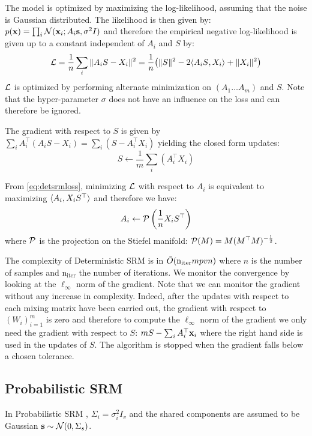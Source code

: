\documentclass{article}
\begin{document}
The model is optimized by maximizing the log-likelihood, assuming that
the noise is Gaussian distributed.
%
The likelihood is then given by: $p(\mathbf{x}) = \prod_i \mathcal{N}(\mathbf{x}_i; A_i \mathbf{s}, \sigma^2 I)$ and
therefore the empirical
%
%
negative log-likelihood is given up to a constant independent of
$A_i$ and $S$ by:
\begin{align}
  \mathcal{L} = \frac1{n} \sum_i \|A_i S - X_i \|^2 = \frac1{n} \big(\| S \|^2 -2 \langle{ A_i S},{ X_i }\rangle + \| X_i \|^2 \big)
  \label{eq:detsrmloss}
\end{align}
$\mathcal{L}$ is optimized by performing alternate minimization on $(A_1 \dots A_m)$
and $S$.
%
Note that the hyper-parameter $\sigma$ does not have an influence on
the loss and can therefore be ignored.



The gradient with respect to $S$ is given by $\sum_i A_i^{\top}(A_i S -
X_i) = \sum_i (S - A_i^{\top} X_i)$
yielding the closed form updates:
\begin{equation}
  S \leftarrow  \frac1m \sum_i (A_i^{\top} X_i)
  \label{eq:srm:supdate}
\end{equation}

From \eqref{eq:detsrmloss}, minimizing $\mathcal{L}$ with respect to $A_i$ is
equivalent to maximizing $\langle{ A_i},{ X_i S^{\top} }\rangle$ and therefore we
have:
\begin{equation}
  A_i \leftarrow  \mathcal{P} \left(\frac1{n}X_i S^{\top} \right)
  \label{eq:detsrm:Aiupdate}
\end{equation}
where $\mathcal{P}$ is the projection on the Stiefel manifold: $\mathcal{P}(M) = M
(M^{\top}M)^{-\frac12}$.
%


The complexity of Deterministic SRM is in $\tilde{O}(\mathrm{n_{iter}} mpvn)$ where
$n$ is the number of samples and $\mathrm{n_{iter}}$ the number of iterations.
%
We monitor the convergence by looking at the $\ell_{\infty}$ norm of the
gradient.
%
Note that we can monitor the gradient without any increase in complexity.
%
Indeed, after the updates with respect to each mixing matrix have been
carried out, the gradient with respect to $(W_i)_{i=1}^m$ is zero and therefore
to compute the $\ell_{\infty}$ norm of the gradient we only need the gradient
with respect to $S$: $m S - \sum_i A_i^{\top}\mathbf{x}_i$ where the right hand side is
used in the updates of $S$.
%
The algorithm is stopped when the
gradient falls below a chosen tolerance.
%


\subsection{Probabilistic SRM}
\label{sec:probabilisticsrm}
In Probabilistic SRM , $\Sigma_i=\sigma_i^2 I_v$ and the shared
components are assumed to be Gaussian $\mathbf{s} \sim \mathcal{N}(0, \Sigma_s)$.
%
\end{document}
